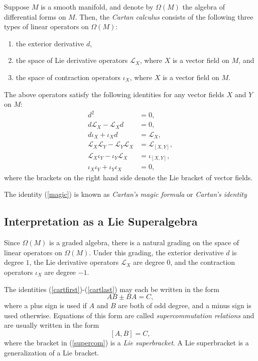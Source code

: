 \documentclass[12pt]{article}
\theoremstyle{definition}
\theoremstyle{remark}
\newcommand{\lie}{\mathcal{L}}
\begin{document}
Suppose $M$ is a smooth manifold, and denote by $\Omega(M)$ the algebra of differential forms on $M$.  Then, the \emph{Cartan calculus} consists of the following three types of linear operators on $\Omega(M)$:
\begin{enumerate}
\item the exterior derivative $d$,
\item the space of Lie derivative operators $\lie_X$, where $X$ is a vector field on $M$, and
\item the space of contraction operators $\iota_X$, where $X$ is a vector field on $M$.
\end{enumerate}

The above operators satisfy the following identities for any vector fields $X$ and $Y$ on $M$:
\begin{align}
d^2 &= 0, \label{cartfirst}\\
d \lie_X - \lie_X d &= 0, \\
d \iota_X + \iota_X d &= \lie_X, \label{magic}\\
\lie_X \lie_Y - \lie_Y \lie_X &= \lie_{[X,Y]}, \\
\lie_X \iota_Y - \iota_Y \lie_X &= \iota_{[X,Y]},\\
\iota_X \iota_Y + \iota_Y \iota_X &= 0, \label{cartlast}
\end{align}
where the brackets on the right hand side denote the Lie bracket of vector fields.

The identity (\ref{magic}) is known as \emph{Cartan's magic formula} or \emph{Cartan's identity}

\subsection*{Interpretation as a Lie Superalgebra}

Since $\Omega(M)$ is a graded algebra, there is a natural grading on the space of linear operators on $\Omega(M)$.  Under this grading, the exterior derivative $d$ is degree $1$, the Lie derivative operators $\lie_X$ are degree $0$, and the contraction operators $\iota_X$ are degree $-1$.

The identities (\ref{cartfirst})-(\ref{cartlast}) may each be written in the form
\begin{equation}
AB \pm BA = C,
\end{equation}
where a plus sign is used if $A$ and $B$ are both of odd degree, and a minus sign is used otherwise.  Equations of this form are called \emph{supercommutation relations} and are usually written in the form
\begin{equation}\label{supercom}
[A,B] = C,
\end{equation}
where the bracket in (\ref{supercom}) is a \emph{Lie superbracket}.  A Lie superbracket is a generalization of a Lie bracket.
\end{document}
